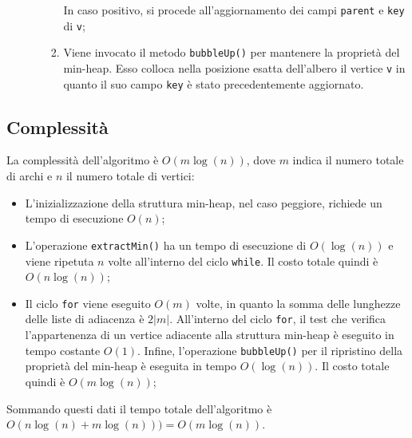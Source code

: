 \begin{itemize}
\begin{enumerate}
\begin{enumerate}
			In caso positivo, si procede all'aggiornamento dei campi \texttt{parent} e \texttt{key} di \texttt{v};
			\item Viene invocato il metodo \texttt{bubbleUp()} per mantenere la proprietà del min-heap. 
			Esso colloca nella posizione esatta dell'albero il vertice \texttt{v} in quanto il suo campo \texttt{key} è stato precedentemente aggiornato.
		\end{enumerate} 
	\end{enumerate}
\end{itemize}

\subsection{Complessità}
	La complessità dell'algoritmo è $O(m\log(n))$, dove $m$ indica il numero totale di archi e $n$ il numero totale di vertici:
	\begin{itemize}
		\item L'inizializzazione della struttura min-heap, nel caso peggiore, richiede un tempo di esecuzione $O(n)$;
		\item L'operazione \texttt{extractMin()} ha un tempo di esecuzione di $O(\log(n))$ e viene ripetuta $n$ volte all'interno del ciclo \texttt{while}. Il costo totale quindi è $O(n\log(n))$;
		\item Il ciclo \texttt{for} viene eseguito $O(m)$ volte, in quanto la somma delle lunghezze delle liste di adiacenza è $2|m|$. All'interno del ciclo \texttt{for}, il test che verifica l'appartenenza di un vertice adiacente alla struttura min-heap è eseguito in tempo costante $O(1)$. 
		Infine, l'operazione \texttt{bubbleUp()} per il ripristino della proprietà del min-heap è eseguita in tempo $O(\log(n))$. 
		Il costo totale quindi è $O(m\log(n))$;
	\end{itemize}
	Sommando questi dati il tempo totale dell'algoritmo è $O(n\log(n) + m\log(n))) = O(m\log(n))$.
	
\pagebreak